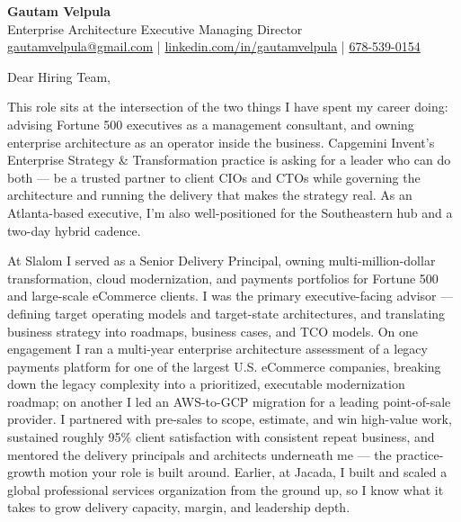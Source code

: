 \documentclass[11pt]{article}
\begin{document}
\begin{center}
    {\LARGE \textbf{Gautam Velpula}} \\[4pt]
    Enterprise Architecture Executive \textbar{} Managing Director \\[6pt]
    \href{mailto:gautamvelpula@gmail.com}{gautamvelpula@gmail.com} \;|\;
    \href{https://www.linkedin.com/in/gautamvelpula}{linkedin.com/in/gautamvelpula} \;|\;
    \href{tel:6785390154}{678-539-0154}
\end{center}

\hrulefill

\vspace{12pt}

Dear Hiring Team,

This role sits at the intersection of the two things I have spent my career doing: advising Fortune 500 executives as a management consultant, and owning enterprise architecture as an operator inside the business. Capgemini Invent's Enterprise Strategy \& Transformation practice is asking for a leader who can do both --- be a trusted partner to client CIOs and CTOs while governing the architecture and running the delivery that makes the strategy real. As an Atlanta-based executive, I'm also well-positioned for the Southeastern hub and a two-day hybrid cadence.

At Slalom I served as a Senior Delivery Principal, owning multi-million-dollar transformation, cloud modernization, and payments portfolios for Fortune 500 and large-scale eCommerce clients. I was the primary executive-facing advisor --- defining target operating models and target-state architectures, and translating business strategy into roadmaps, business cases, and TCO models. On one engagement I ran a multi-year enterprise architecture assessment of a legacy payments platform for one of the largest U.S. eCommerce companies, breaking down the legacy complexity into a prioritized, executable modernization roadmap; on another I led an AWS-to-GCP migration for a leading point-of-sale provider. I partnered with pre-sales to scope, estimate, and win high-value work, sustained roughly 95\% client satisfaction with consistent repeat business, and mentored the delivery principals and architects underneath me --- the practice-growth motion your role is built around. Earlier, at Jacada, I built and scaled a global professional services organization from the ground up, so I know what it takes to grow delivery capacity, margin, and leadership depth.
\end{document}
